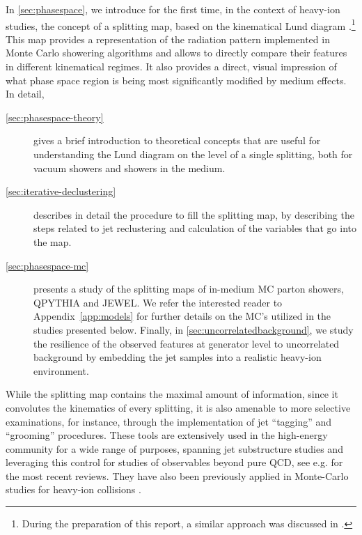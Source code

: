  In \autoref{sec:phasespace}, we introduce for the first time, in the context of heavy-ion studies, the concept of a splitting map, based on the kinematical Lund diagram \cite{Andersson:1988gp}.\footnote{During the preparation of this report, a similar approach was discussed in \cite{Chien:2018dfn}.}
 This map provides a representation of the radiation pattern implemented in Monte Carlo showering algorithms and allows to directly compare their features in different kinematical regimes. It also provides a direct, visual impression of what phase space region is being most significantly modified by medium effects. In detail, 
\begin{description}

\item[\autoref{sec:phasespace-theory}] gives a brief introduction to theoretical concepts that are useful for understanding the Lund diagram on the level of a single splitting, both for vacuum showers and showers in the medium.

\item[\autoref{sec:iterative-declustering}] describes in detail the procedure to fill the splitting map, by describing the steps related to jet reclustering and calculation of the variables that go into the map. 

\item[\autoref{sec:phasespace-mc}] presents a study of the splitting maps of in-medium MC parton showers, QPYTHIA and JEWEL. 
We refer the interested reader to Appendix~\ref{app:models} for further details on the MC's utilized in the studies presented below. 
Finally, in \autoref{sec:uncorrelatedbackground}, we study the resilience of the observed   features at generator level to uncorrelated background by embedding the jet samples into a realistic heavy-ion environment.

\end{description}
While the splitting map contains the maximal amount of information, since it convolutes the kinematics of every splitting, it is also amenable to more selective examinations, for instance, through the implementation of jet ``tagging'' and ``grooming'' procedures. These tools are extensively used in the high-energy community \cite{Bendavid:2018nar} for a wide range of purposes, spanning jet substructure studies and leveraging this control for studies of observables beyond pure QCD, see e.g. \cite{Larkoski:2017jix,Asquith:2018igt} for the most recent reviews. They have also been previously applied in Monte-Carlo studies for heavy-ion collisions \cite{Zhang:2015trf,Apolinario:2017qay,Milhano:2017nzm}. 
